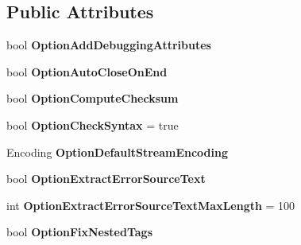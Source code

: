 \subsection*{Public Attributes}
\begin{DoxyCompactItemize}
\item 
\mbox{\label{class_html_agility_pack_1_1_html_document_a2cf668dcda23a98c29c85163a4358263}} 
bool {\bfseries Option\+Add\+Debugging\+Attributes}
\item 
\mbox{\label{class_html_agility_pack_1_1_html_document_a40268a813d669a6b004b542840f262c4}} 
bool {\bfseries Option\+Auto\+Close\+On\+End}
\item 
\mbox{\label{class_html_agility_pack_1_1_html_document_aacb32b5d47df749144ec6a59641ae148}} 
bool {\bfseries Option\+Compute\+Checksum}
\item 
\mbox{\label{class_html_agility_pack_1_1_html_document_ae5f05b3668d070d9e69c4be19be4b3fc}} 
bool {\bfseries Option\+Check\+Syntax} = true
\item 
\mbox{\label{class_html_agility_pack_1_1_html_document_a749c038f46ef4979f5a97c3c8e204f85}} 
Encoding {\bfseries Option\+Default\+Stream\+Encoding}
\item 
\mbox{\label{class_html_agility_pack_1_1_html_document_a504adb7f84929e373ef8cfde73e80734}} 
bool {\bfseries Option\+Extract\+Error\+Source\+Text}
\item 
\mbox{\label{class_html_agility_pack_1_1_html_document_aeccf612f99e961e07408cba393374fe2}} 
int {\bfseries Option\+Extract\+Error\+Source\+Text\+Max\+Length} = 100
\item 
\mbox{\label{class_html_agility_pack_1_1_html_document_aabe37347a017a334d81ee4ef9f2c671e}} 
bool {\bfseries Option\+Fix\+Nested\+Tags}
\item 
\mbox{\label{class_html_agility_pack_1_1_html_document_abb5c14b55e24fc56f892450328df2445}} 

\end{DoxyCompactItemize}
